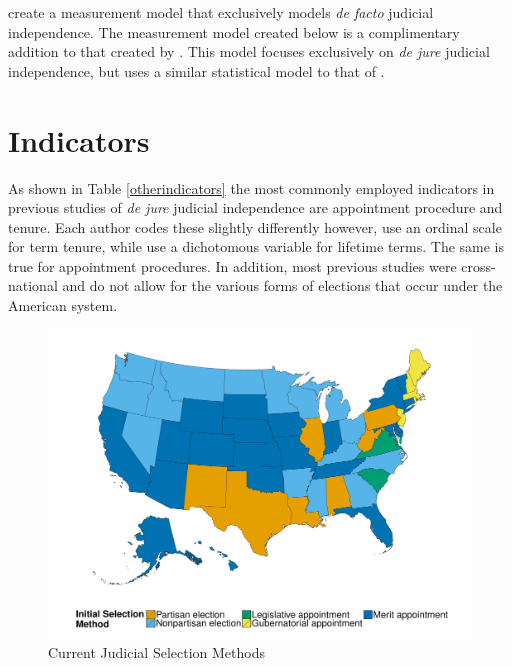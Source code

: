\documentclass[12pt]{article}
\begin{document}
\citet*{Linzer2014} create a measurement model that exclusively models \textit{de facto} judicial independence.  The measurement model created below is a complimentary addition to that created by \citeauthor{Linzer2014}.  This model focuses exclusively on \textit{de jure} judicial independence, but uses a similar statistical model to that of \citeauthor{Linzer2014}.  

\section{Indicators}\label{Indicators}
As shown in Table \ref{otherindicators} the most commonly employed indicators in previous studies of \textit{de jure} judicial independence are appointment procedure and tenure.  Each author codes these slightly differently however, \citet{Feld2003} use an ordinal scale for term tenure, while \citet{Melton2014} use a dichotomous variable for lifetime terms.  The same is true for appointment procedures.  In addition, most previous studies were cross-national and do not allow for the various forms of elections that occur under the American system.    


\begin{figure}[tbh]\centering\caption{Current Judicial Selection Methods}\label{selectionmap}
	\includegraphics[scale=.5]{graphics/colr_select.pdf}
\end{figure}
\end{document}

